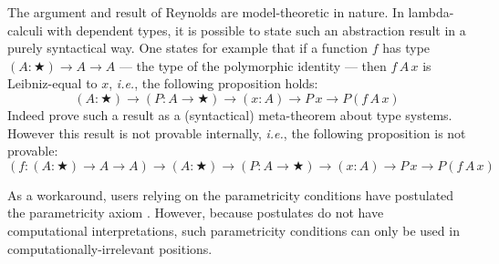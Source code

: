 \documentclass[english]{PaperTools/latex/entcs}
\theoremstyle{plain}
\theoremstyle{definition}
\theoremstyle{remark}
\def\ie{\textit{i.e.}}
\begin{document}
The argument and result of Reynolds are model-theoretic in nature.
In lambda-calculi with dependent types, it is possible to state such an
abstraction result in a purely syntactical way.
One states for example that if a function $f$ has type
$(A : ★) → A → A$ --- the type of the polymorphic identity --- then
$f\,A\,x$ is Leibniz-equal to $x$, \ie, the following proposition holds:
$$ (A : ★) → (P : A → ★) → (x : A) → P\, x → P (f\, A\, x) $$
%
Indeed \citet{bernardy_proofs_2012} prove such a result as a
(syntactical) meta-theorem about type systems. However this result is
not provable internally, \ie, the following proposition is not provable:
\begin{equation}
  \label{eq:param-id}
  (f : (A:★) → A → A) →  (A : ★) → (P : A → ★) → (x : A) → P\, x → P (f\, A\, x)
\end{equation}

As a workaround, users relying on the parametricity conditions have
postulated the parametricity axiom
\citep{pouillard_nameless_2011,chlipala_parametric_2008,atkey_unembedding_2009}.
However, %
because postulates do not have computational interpretations, such
parametricity conditions can only be used in computationally-irrelevant
positions.
\end{document}
